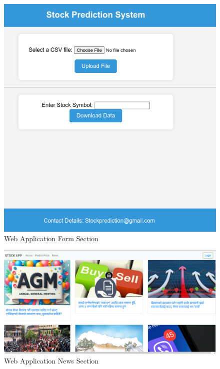 \documentclass[./main.tex]{subfiles}
\begin{document}
\begin{figure}[H]
    \centering
    \includegraphics[width=1\linewidth]{images/web-applicationForm.png}
    \caption{Web Application Form Section}
    \label{fig:7.8}
\end{figure}
\begin{figure}[H]
    \centering
    \includegraphics[width=1\linewidth]{images/web-application-news.png}
    \caption{Web Application News Section}
    \label{fig:7.9}
\end{figure}
\end{document}
